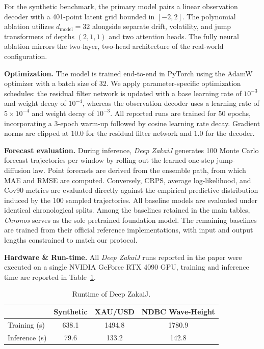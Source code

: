 \documentclass{article}
\begin{document}
For the synthetic benchmark, the primary model pairs a linear observation decoder with a 401-point latent grid bounded in $[-2,2]$. The polynomial ablation utilizes $d_{\mathrm{model}}=32$ alongside separate drift, volatility, and jump transformers of depths $(2,1,1)$ and two attention heads. The fully neural ablation mirrors the two-layer, two-head architecture of the real-world configuration.

\textbf{Optimization.}
The model is trained end-to-end in PyTorch using the AdamW optimizer with a batch size of 32. We apply parameter-specific optimization schedules: the residual filter network is updated with a base learning rate of $10^{-3}$ and weight decay of $10^{-4}$, whereas the observation decoder uses a learning rate of $5\times 10^{-4}$ and weight decay of $10^{-3}$. All reported runs are trained for 50 epochs, incorporating a 3-epoch warm-up followed by cosine learning rate decay. Gradient norms are clipped at $10.0$ for the residual filter network and $1.0$ for the decoder.

\textbf{Forecast evaluation.}
During inference, \textit{Deep ZakaiJ} generates 100 Monte Carlo forecast trajectories per window by rolling out the learned one-step jump-diffusion law. Point forecasts are derived from the ensemble path, from which MAE and RMSE are computed. Conversely, CRPS, average log-likelihood, and Cov90 metrics are evaluated directly against the empirical predictive distribution induced by the 100 sampled trajectories. All baseline models are evaluated under identical chronological splits. Among the baselines retained in the main tables, \textit{Chronos} serves as the sole pretrained foundation model. The remaining baselines are trained from their official reference implementations, with input and output lengths constrained to match our protocol.

\textbf{Hardware \& Run-time.}
All \textit{Deep ZakaiJ} runs reported in the paper were executed on a single NVIDIA GeForce RTX 4090 GPU, training and inference time are reported in Table~\ref{app:run_time}.
\begin{table}[H]
\centering
\caption{Runtime of Deep ZakaiJ.}
\label{app:run_time}
\scriptsize
\begin{tabular}{lccc}
\toprule
 & Synthetic & XAU/USD & NDBC Wave-Height \\
\midrule
Training (s) & 638.1 & 1494.8 & 1780.9 \\
Inference (s) & 79.6 & 133.2 & 142.8 \\
\bottomrule
\end{tabular}
\end{table}
\end{document}
